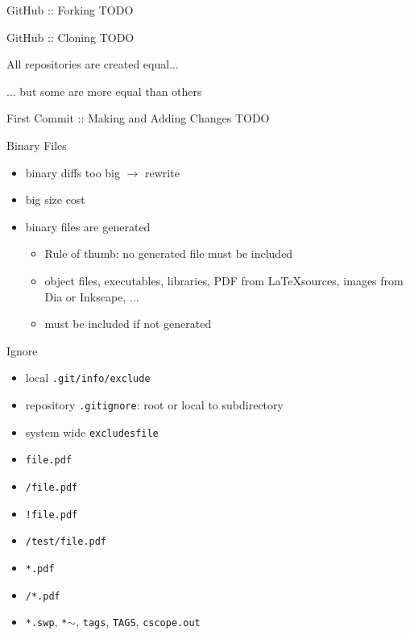 \documentclass{beamer}
\begin{document}
\begin{frame}{GitHub :: Forking}
  TODO
\end{frame}

\begin{frame}{GitHub :: Cloning}
  TODO
\end{frame}

\begin{frame}{All repositories are created equal...}
  \begin{center}
  \end{center}
\end{frame}

\begin{frame}{... but some are more equal than others}
  \begin{center}
  \end{center}
\end{frame}

\begin{frame}{First Commit :: Making and Adding Changes}
  TODO
\end{frame}

\begin{frame}{Binary Files}
  \begin{itemize}
    \item binary diffs too big $\rightarrow$ rewrite
    \item big size cost
    \item binary files are generated
      \begin{itemize}
        \item Rule of thumb: no generated file must be included
        \item object files, executables, libraries, PDF from \LaTeX sources,
        images from Dia or Inkscape, $\ldots$
        \item must be included if not generated
      \end{itemize}
  \end{itemize}
\end{frame}

\begin{frame}{Ignore}
  \begin{itemize}
    \item local \texttt{.git/info/exclude}
    \item repository \texttt{.gitignore}: root or local to subdirectory
    \item system wide \texttt{excludesfile}
  \end{itemize}
  \pause
  \begin{itemize}
    \item \texttt{file.pdf}
    \item \texttt{/file.pdf}
    \item \texttt{!file.pdf}
    \item \texttt{/test/file.pdf}
    \item \texttt{*.pdf}
    \item \texttt{/*.pdf}
    \item \texttt{*.swp}, \texttt{*$\sim$}, \texttt{tags}, \texttt{TAGS},
      \texttt{cscope.out}
  \end{itemize}
\end{frame}
\end{document}
